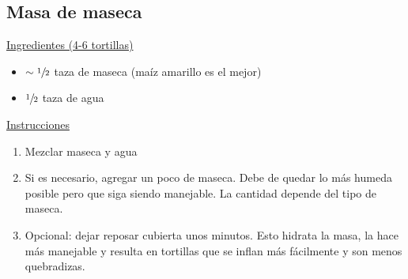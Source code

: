 \subsection{Masa de maseca}
\label{receta:masa-maseca}

\underline{Ingredientes (4-6 tortillas)}
\begin{itemize}
\item $\sim\sfrac{1}{2}$ taza de maseca (maíz amarillo es el mejor)
\item $\sfrac{1}{2}$ taza de agua
\end{itemize}

\underline{Instrucciones}
\begin{enumerate}
\item Mezclar maseca y agua
\item Si es necesario, agregar un poco de maseca. Debe de quedar lo más humeda posible pero que siga siendo manejable. La cantidad depende del tipo de maseca.
\item Opcional: dejar reposar cubierta unos minutos. Esto hidrata la masa, la hace más manejable y resulta en tortillas que se inflan más fácilmente y son menos quebradizas.
\end{enumerate}